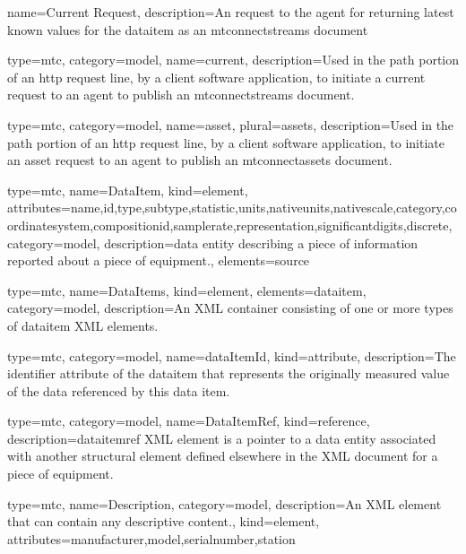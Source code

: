 {
  name={Current Request},
  description={An  request to the \gls{agent} for returning latest known values for the \gls{dataitem} as an \gls{mtconnectstreams}  document}
}


{
  type=mtc,
  category=model,
  name={current},
  description={Used in the path portion of an \gls{http request line}, by a client software application, to initiate a \gls{current request} to an \gls{agent} to publish an \gls{mtconnectstreams} document.}
}

{
  type=mtc,
  category=model,
  name={asset},
  plural={assets},
  description={Used in the path portion of an \gls{http request line}, by a client software application, to initiate an \gls{asset request} to an \gls{agent} to publish an \gls{mtconnectassets} document.}
}



{
  type=mtc,
  name={DataItem},
  kind={element},
  attributes={\gls{name},\gls{id},\gls{type},\gls{subtype},\gls{statistic},\gls{units},\gls{nativeunits},\gls{nativescale},\gls{category},\gls{coordinatesystem},\gls{compositionid},\gls{samplerate},\gls{representation},\gls{significantdigits},\gls{discrete}},
  category=model,
  description={\gls{data entity} describing a piece of information reported about a piece of equipment.},
  elements={\gls{source}}
}

{
  type=mtc,
  name={DataItems},
  kind={element},
  elements={\gls{dataitem}},
  category=model,
  description={An XML container consisting of one or more types of \gls{dataitem} XML elements.}
}

{
  type=mtc,
  category=model,
  name={dataItemId},
  kind={attribute},
  description={The identifier attribute of the \gls{dataitem} that represents the originally measured value of the data referenced by this data item.}
}


{
  type=mtc,
  category=model,
  name={DataItemRef},
  kind={reference},
  description={\gls{dataitemref} XML element is a pointer to a \gls{data entity} associated with another \gls{structural element} defined elsewhere in the XML document for a piece of equipment.}
}


{
  type=mtc,
  name={Description},
  category=model,
  description={An XML element that can contain any descriptive content.},
  kind={element},
  attributes={\gls{manufacturer},\gls{model},\gls{serialnumber},\gls{station}}
}


